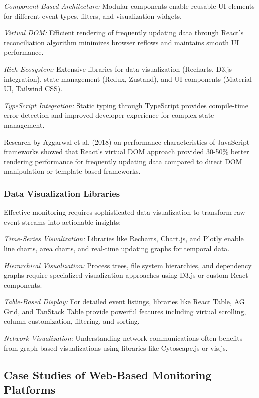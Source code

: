 \textit{Component-Based Architecture:} Modular components enable reusable UI elements for different event types, filters, and visualization widgets.

\textit{Virtual DOM:} Efficient rendering of frequently updating data through React's reconciliation algorithm minimizes browser reflows and maintains smooth UI performance.

\textit{Rich Ecosystem:} Extensive libraries for data visualization (Recharts, D3.js integration), state management (Redux, Zustand), and UI components (Material-UI, Tailwind CSS).

\textit{TypeScript Integration:} Static typing through TypeScript provides compile-time error detection and improved developer experience for complex state management.

Research by Aggarwal et al. (2018) on performance characteristics of JavaScript frameworks showed that React's virtual DOM approach provided 30-50\% better rendering performance for frequently updating data compared to direct DOM manipulation or template-based frameworks.

\subsubsection{Data Visualization Libraries}
Effective monitoring requires sophisticated data visualization to transform raw event streams into actionable insights:

\textit{Time-Series Visualization:} Libraries like Recharts, Chart.js, and Plotly enable line charts, area charts, and real-time updating graphs for temporal data.

\textit{Hierarchical Visualization:} Process trees, file system hierarchies, and dependency graphs require specialized visualization approaches using D3.js or custom React components.

\textit{Table-Based Display:} For detailed event listings, libraries like React Table, AG Grid, and TanStack Table provide powerful features including virtual scrolling, column customization, filtering, and sorting.

\textit{Network Visualization:} Understanding network communications often benefits from graph-based visualizations using libraries like Cytoscape.js or vis.js.

\subsection{Case Studies of Web-Based Monitoring Platforms}

